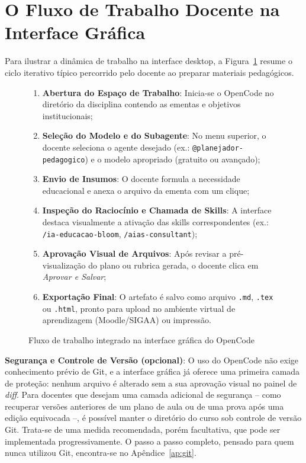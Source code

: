 \section{O Fluxo de Trabalho Docente na Interface Gr{\'a}fica}

Para ilustrar a din{\^a}mica de trabalho na interface desktop, a Figura~\ref{fig:fluxo-desktop} resume o ciclo iterativo t{\'i}pico percorrido pelo docente ao preparar materiais pedag{\'o}gicos.

\begin{figure}[htbp]
  \centering
  \begin{tcolorbox}[colback=boxbg, colframe=primary, arc=2mm, title={\bfseries Ciclo de Trabalho Docente no OpenCode Desktop}]
    \small
    \begin{enumerate}
      \item \textbf{Abertura do Espa{\c c}o de Trabalho}: Inicia-se o OpenCode no diret{\'o}rio da disciplina contendo as ementas e objetivos institucionais;
      \item \textbf{Sele{\c c}{\~a}o do Modelo e do Subagente}: No menu superior, o docente seleciona o agente desejado (ex.: \texttt{@planejador-pedagogico}) e o modelo apropriado (gratuito ou avan{\c c}ado);
      \item \textbf{Envio de Insumos}: O docente formula a necessidade educacional e anexa o arquivo da ementa com um clique;
      \item \textbf{Inspe{\c c}{\~a}o do Racioc{\'i}nio e Chamada de Skills}: A interface destaca visualmente a ativa{\c c}{\~a}o das skills correspondentes (ex.: \texttt{/ia-educacao-bloom}, \texttt{/aias-consultant});
      \item \textbf{Aprova{\c c}{\~a}o Visual de Arquivos}: Ap{\'o}s revisar a pr{\'e}-visualiza{\c c}{\~a}o do plano ou rubrica gerada, o docente clica em \emph{Aprovar e Salvar};
      \item \textbf{Exporta{\c c}{\~a}o Final}: O artefato {\'e} salvo como arquivo \texttt{.md}, \texttt{.tex} ou \texttt{.html}, pronto para upload no ambiente virtual de aprendizagem (Moodle/SIGAA) ou impress{\~a}o.
    \end{enumerate}
  \end{tcolorbox}
  \caption{Fluxo de trabalho integrado na interface gr{\'a}fica do OpenCode}
  \label{fig:fluxo-desktop}
\end{figure}

\begin{atencaopedagogica}
\textbf{Seguran{\c c}a e Controle de Vers{\~a}o (opcional)}: O uso do OpenCode n{\~a}o exige conhecimento pr{\'e}vio de Git, e a interface gr{\'a}fica j{\'a} oferece uma primeira camada de prote{\c c}{\~a}o: nenhum arquivo {\'e} alterado sem a sua aprova{\c c}{\~a}o visual no painel de \emph{diff}. Para docentes que desejam uma camada adicional de seguran{\c c}a -- como recuperar vers{\~o}es anteriores de um plano de aula ou de uma prova ap{\'o}s uma edi{\c c}{\~a}o equivocada --, {\'e} poss{\'i}vel manter o diret{\'o}rio do curso sob controle de vers{\~a}o Git. Trata-se de uma medida recomendada, por{\'e}m facultativa, que pode ser implementada progressivamente. O passo a passo completo, pensado para quem nunca utilizou Git, encontra-se no Ap{\^e}ndice~\ref{ap:git}.
\end{atencaopedagogica}

